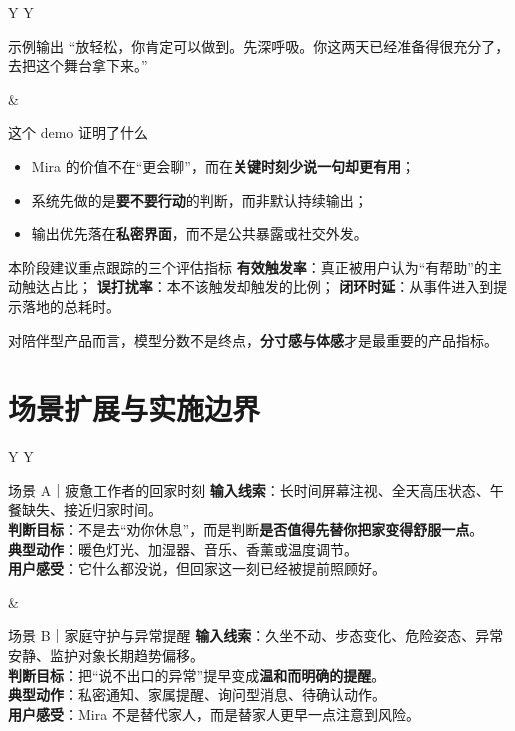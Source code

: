 \documentclass[11pt,fontset=none]{ctexart}
\begin{document}
\vspace{2mm}
\begin{tabularx}{\linewidth}{Y Y}
\begin{greencard}{示例输出}
“放轻松，你肯定可以做到。先深呼吸。你这两天已经准备得很充分了，去把这个舞台拿下来。”
\end{greencard}
&
\begin{bluecard}{这个 demo 证明了什么}
\begin{itemize}
  \item Mira 的价值不在“更会聊”，而在\textbf{关键时刻少说一句却更有用}；
  \item 系统先做的是\textbf{要不要行动}的判断，而非默认持续输出；
  \item 输出优先落在\textbf{私密界面}，而不是公共暴露或社交外发。
\end{itemize}
\end{bluecard}
\end{tabularx}

\vspace{2mm}
\begin{card}{本阶段建议重点跟踪的三个评估指标}
\textbf{有效触发率}：真正被用户认为“有帮助”的主动触达占比；\quad
\textbf{误打扰率}：本不该触发却触发的比例；\quad
\textbf{闭环时延}：从事件进入到提示落地的总耗时。\par
对陪伴型产品而言，模型分数不是终点，\textbf{分寸感与体感}才是最重要的产品指标。
\end{card}

\newpage

\section{场景扩展与实施边界}
\begin{tabularx}{\linewidth}{Y Y}
\begin{card}{场景 A｜疲惫工作者的回家时刻}
\textbf{输入线索}\;：长时间屏幕注视、全天高压状态、午餐缺失、接近归家时间。\\
\textbf{判断目标}\;：不是去“劝你休息”，而是判断\textbf{是否值得先替你把家变得舒服一点}。\\
\textbf{典型动作}\;：暖色灯光、加湿器、音乐、香薰或温度调节。\\
\textbf{用户感受}\;：它什么都没说，但回家这一刻已经被提前照顾好。
\end{card}
&
\begin{card}{场景 B｜家庭守护与异常提醒}
\textbf{输入线索}\;：久坐不动、步态变化、危险姿态、异常安静、监护对象长期趋势偏移。\\
\textbf{判断目标}\;：把“说不出口的异常”提早变成\textbf{温和而明确的提醒}。\\
\textbf{典型动作}\;：私密通知、家属提醒、询问型消息、待确认动作。\\
\textbf{用户感受}\;：Mira 不是替代家人，而是替家人更早一点注意到风险。
\end{card}
\end{tabularx}
\end{document}
